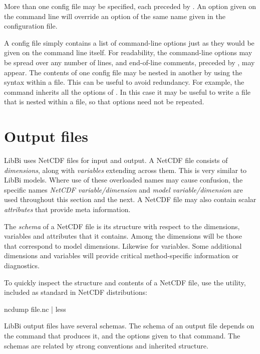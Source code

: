 More than one config file may be specified, each preceded by . An
option given on the command line will override an option of the same name
given in the configuration file.

A config file simply contains a list of command-line options just as they
would be given on the command line itself. For readability, the command-line
options may be spread over any number of lines, and end-of-line comments,
preceded by \bitt{\#}, may appear. The contents of one config file may be
nested in another by using the  syntax within a file. This
can be useful to avoid redundancy. For example, the  command
inherits all the options of . In this case it may be useful
to write a  file that is nested within a 
file, so that options need not be repeated.

\section{Output files}

LibBi uses NetCDF files for input and output. A
NetCDF file consists of \emph{dimensions}, along with \emph{variables}
extending across them. This is very similar to LibBi models. Where use of
these overloaded names may cause confusion, the specific names \emph{NetCDF
  variable/dimension} and \emph{model variable/dimension} are used throughout
this section and the next. A NetCDF file may also contain scalar
\emph{attributes} that provide meta information.

The \emph{schema} of a NetCDF file is its structure with respect to the
dimensions, variables and attributes that it contains. Among the dimensions
will be those that correspond to model dimensions. Likewise for
variables. Some additional dimensions and variables will provide critical
method-specific information or diagnostics.

\begin{tip}
To quickly inspect the structure and contents of a NetCDF file, use the
 utility, included as standard in NetCDF distributions:
\begin{cmdcode}
ncdump file.nc | less
\end{cmdcode}
\end{tip}

LibBi output files have several schemas. The schema of an output file depends
on the command that produces it, and the options given to that command. The
schemas are related by strong conventions and inherited structure.

